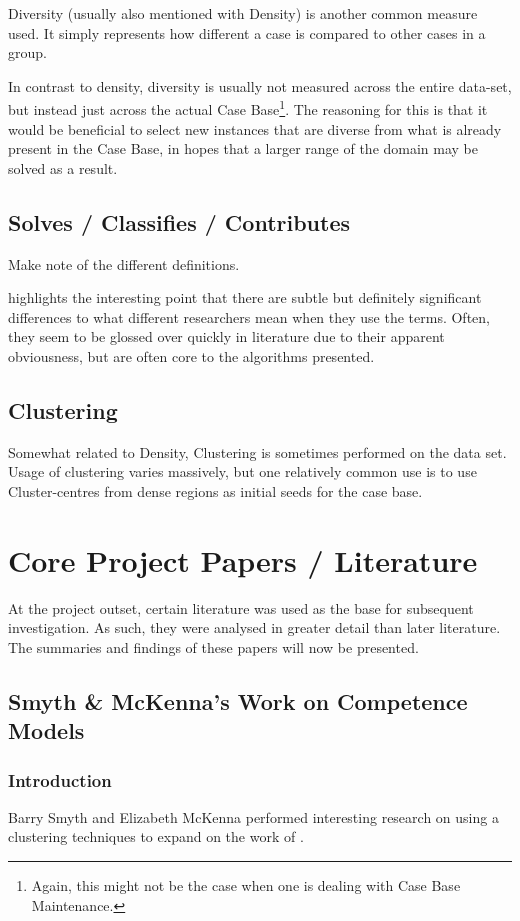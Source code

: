 \documentclass[a4paper,11pt]{report}
\begin{document}
Diversity (usually also mentioned with Density) is another common measure used. It simply represents how different a case is compared to other cases in a group.

In contrast to density, diversity is usually not measured across the entire data-set, but instead just across the actual Case Base\footnote{Again, this might not be the case when one is dealing with Case Base Maintenance.}. The reasoning for this is that it would be beneficial to select new instances that are diverse from what is already present in the Case Base, in hopes that a larger range of the domain may be solved as a result. 

\subsection{Solves / Classifies / Contributes}


Make note of the different definitions.

highlights the interesting point that there are subtle but definitely significant differences to what different researchers mean when they use the terms. Often, they seem to be glossed over quickly in literature due to their apparent obviousness, but are often core to the algorithms presented.

\subsection{Clustering}
Somewhat related to Density, Clustering is sometimes performed on the data set. Usage of clustering varies massively, but one relatively common use is to use Cluster-centres from dense regions as initial seeds for the case base.

\section{Core Project Papers / Literature}
At the project outset, certain literature was used as the base for subsequent investigation. As such, they were analysed in greater detail than later literature. The summaries and findings of these papers will now be presented.

\subsection{Smyth \& McKenna's Work on Competence Models}
\subsubsection{Introduction}
Barry Smyth and Elizabeth McKenna performed interesting research on using a clustering techniques to expand on the work of \citet{Smyth1995} \cite{Smyth1998}.
\end{document}
